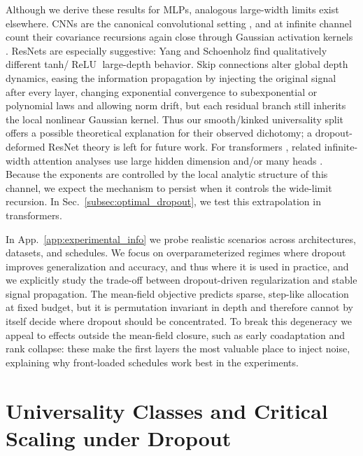 \documentclass{article}
\DeclareMathOperator{\ReLU}{ReLU}
\newcommand{\relu}{\ensuremath{\ReLU}}
\theoremstyle{plain}
\theoremstyle{definition}
\theoremstyle{remark}
\begin{document}
Although we derive these results for MLPs, analogous large-width limits exist elsewhere. CNNs are the canonical convolutional setting \cite{cnnslecun}, and at infinite channel count their covariance recursions again close through Gaussian activation kernels \cite{xiao2018dynamicalisometrymeanfield}. ResNets are especially suggestive: Yang and Schoenholz \cite{yang2017meanfieldresnets} find qualitatively different tanh/\relu{} large-depth behavior. Skip connections alter global depth dynamics, easing the information propagation by injecting the original signal after every layer, changing exponential convergence to subexponential or polynomial laws and allowing norm drift, but each residual branch still inherits the local nonlinear Gaussian kernel. Thus our smooth/kinked universality split offers a possible theoretical explanation for their observed dichotomy; a dropout-deformed ResNet theory is left for future work. For transformers \cite{vaswani2023attentionneed}, related infinite-width attention analyses use large hidden dimension and/or many heads \cite{Hron2020InfiniteAttention}. Because the exponents are controlled by the local analytic structure of this channel, we expect the mechanism to persist when it controls the wide-limit recursion. In Sec.~\ref{subsec:optimal_dropout}, we test this extrapolation in transformers.

In App.~\ref{app:experimental_info} we probe realistic scenarios across architectures, datasets, and schedules. We focus on overparameterized regimes where dropout improves generalization and accuracy, and thus where it is used in practice, and we explicitly study the trade-off between dropout-driven regularization and stable signal propagation. The mean-field objective predicts sparse, step-like allocation at fixed budget, but it is permutation invariant in depth and therefore cannot by itself decide where dropout should be concentrated. To break this degeneracy we appeal to effects outside the mean-field closure, such as early coadaptation and rank collapse: these make the first layers the most valuable place to inject noise, explaining why front-loaded schedules work best in the experiments.










\section{Universality Classes and Critical Scaling under Dropout}
\end{document}
